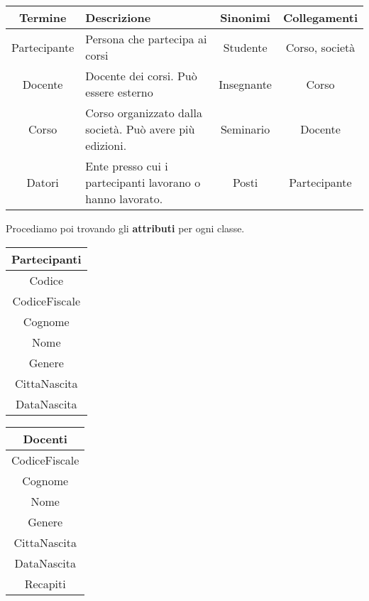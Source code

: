 \begin{example}
	\begin{center}
		\begin{tabular}{|c|p{30mm}|c|c|}
			\hline
			\textbf{Termine} & \textbf{Descrizione} & \textbf{Sinonimi} & \textbf{Collegamenti} \\
			\hline
			Partecipante & Persona che partecipa ai corsi & Studente & Corso, società \\
			\hline
			Docente & Docente dei corsi. Può essere esterno & Insegnante & Corso \\
			\hline
			Corso & Corso organizzato dalla società. Può avere più edizioni. & Seminario & Docente \\
			\hline
			Datori & Ente presso cui i partecipanti lavorano o hanno lavorato. & Posti & Partecipante \\
			\hline			 
		\end{tabular}
	\end{center}
	Procediamo poi trovando gli \textbf{attributi}  per ogni classe.\\
	\begin{center}
		\begin{tabular}{|c|}
			\hline
			\textbf{Partecipanti} \\
			\hline
			Codice \\
			\hline
			CodiceFiscale\\
			\hline
			Cognome \\
			\hline
			Nome \\
			\hline
			Genere \\
			\hline
			CittaNascita \\
			\hline
			DataNascita \\
			\hline
		\end{tabular}
		\hspace{15pt}
		\begin{tabular}{|c|}
			\hline
			\textbf{Docenti} \\
			\hline
			CodiceFiscale\\
			\hline
			Cognome \\
			\hline
			Nome \\
			\hline
			Genere \\
			\hline
			CittaNascita \\
			\hline
			DataNascita \\
			\hline
			Recapiti \\
			\hline
		\end{tabular}
		\hspace{15pt}
		\begin{tabular}{|c|}

\end{tabular}
\end{center}
\end{example}
